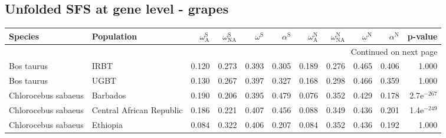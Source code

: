 \subsection{Unfolded SFS at gene level - grapes} 
\begin{longtable}{llrrrrrrrrr}
\toprule
             Species &                Population & $\omega_{\textrm{A}}^{\textrm{S}}$ & $\omega_{\textrm{NA}}^{\textrm{S}}$ & $\omega^{\textrm{S}}$ & $\alpha^{\textrm{S}}$ & $\omega_{\textrm{A}}^{\textrm{N}}$ & $\omega_{\textrm{NA}}^{\textrm{N}}$ & $\omega^{\textrm{N}}$ & $\alpha^{\textrm{N}}$ &       p-value \\
\midrule
\endhead
\midrule
\multicolumn{11}{r}{{Continued on next page}} \\
\midrule
\endfoot

\bottomrule
\endlastfoot
          Bos taurus &                      IRBT &                              0.120 &                               0.273 &                 0.393 &                 0.305 &                              0.189 &                               0.276 &                 0.465 &                 0.406 &         1.000 \\
          Bos taurus &                      UGBT &                              0.130 &                               0.267 &                 0.397 &                 0.327 &                              0.168 &                               0.298 &                 0.466 &                 0.359 &         1.000 \\
 Chlorocebus sabaeus &                  Barbados &                              0.190 &                               0.206 &                 0.395 &                 0.479 &                              0.076 &                               0.352 &                 0.429 &                 0.178 & 2.7e$^{-267}$ \\
 Chlorocebus sabaeus &  Central African Republic &                              0.186 &                               0.221 &                 0.407 &                 0.456 &                              0.088 &                               0.349 &                 0.436 &                 0.201 & 1.4e$^{-249}$ \\
 Chlorocebus sabaeus &                  Ethiopia &                              0.084 &                               0.322 &                 0.406 &                 0.207 &                              0.084 &                               0.352 &                 0.436 &                 0.192 &         1.000 \\

\end{longtable}
